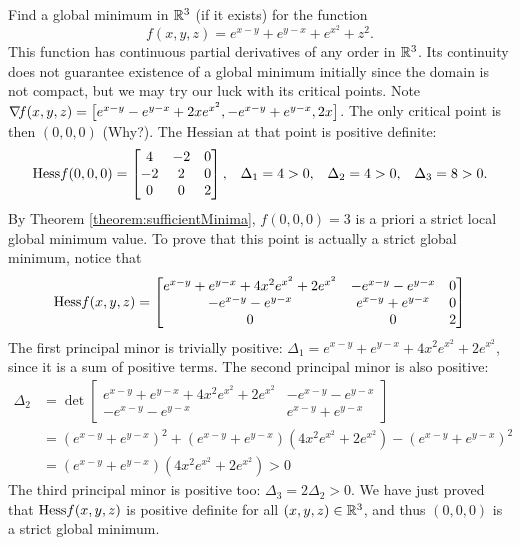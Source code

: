 \begin{example}
Find a global minimum in $\mathbb{R}^3$ (if it exists) for the function 
\begin{equation*}
f(x,y,z)=e^{x-y} + e^{y-x} + e^{x^2}+z^2.
\end{equation*}
This function has continuous partial derivatives of any order in $\mathbb{R}^3$. Its continuity does not guarantee existence of a global minimum initially since the domain is not compact, but we may try our luck with its critical points.  Note $\mathop{\nabla\! {f}}(x,y,z) = \big[ e^{x-y} - e^{y-x} + 2xe^{x^2}, -e^{x-y}+e^{y-x}, 2x \big]$.  The only critical point is then $(0,0,0)$ (Why?). The Hessian at that point is positive definite:
\begin{align*}
&&\mathop{\mathrm{Hess}{f}}(0,0,0) &= \begin{bmatrix} 4 & -2 & 0 \\ -2 & 2 & 0 \\ 0 & 0 & 2 \end{bmatrix}, &
\Delta_1 &= 4 > 0, & \Delta_2 &= 4 >0, &\Delta_3 &= 8 > 0.
\end{align*}
By Theorem \ref{theorem:sufficientMinima}, $f(0,0,0)=3$ is a priori a strict local global minimum value.  To prove that this point is actually a strict global minimum, notice that 
\begin{equation*}
\mathop{\mathrm{Hess}{f}}(x,y,z)= \begin{bmatrix} 
e^{x-y}+e^{y-x}+4x^2e^{x^2}+2e^{x^2} & -e^{x-y}-e^{y-x} & 0 \\
-e^{x-y}-e^{y-x} & e^{x-y}+e^{y-x} & 0 \\
0 & 0 & 2 
\end{bmatrix}
\end{equation*}
The first principal minor is trivially positive: $\Delta_1 = e^{x-y}+e^{y-x}+4x^2e^{x^2}+2e^{x^2}$, since it is a sum of positive terms.  The second principal minor is also positive:
\begin{align*}
\Delta_2 &= \det \begin{bmatrix} e^{x-y}+e^{y-x}+4x^2e^{x^2}+2e^{x^2} & -e^{x-y}-e^{y-x} \\ -e^{x-y}-e^{y-x} & e^{x-y}+e^{y-x} \end{bmatrix} \\
&= (e^{x-y}+e^{y-x})^2 + (e^{x-y}+e^{y-x})(4x^2e^{x^2}+2e^{x^2}) - (e^{x-y}+e^{y-x})^2 \\
&= (e^{x-y}+e^{y-x})(4x^2e^{x^2}+2e^{x^2}) > 0 
\end{align*}
The third principal minor is positive too: $\Delta_3 = 2\Delta_2 > 0$.  We have just proved that $\mathop{\mathrm{Hess}{f}}(x,y,z)$ is positive definite for all $(x,y,z) \in \mathbb{R}^3$, and thus $(0,0,0)$ is a strict global minimum.
\end{example}

